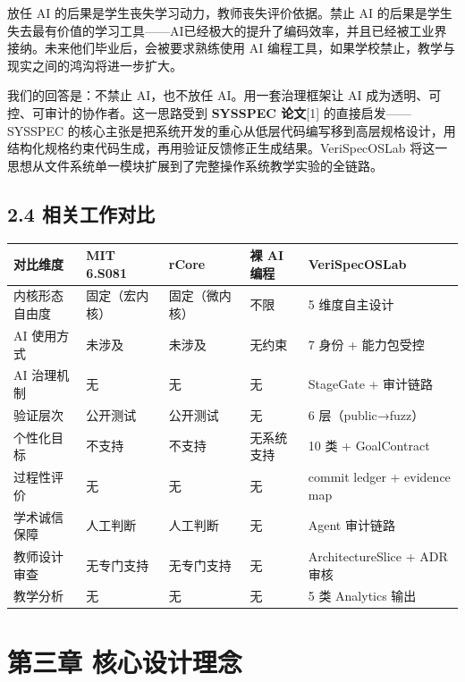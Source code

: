 \documentclass[UTF8,a4paper,12pt,openany]{ctexrep}
\begin{document}
放任 AI 的后果是学生丧失学习动力，教师丧失评价依据。禁止 AI 的后果是学生失去最有价值的学习工具------AI已经极大的提升了编码效率，并且已经被工业界接纳。未来他们毕业后，会被要求熟练使用 AI 编程工具，如果学校禁止，教学与现实之间的鸿沟将进一步扩大。

我们的回答是：不禁止 AI，也不放任 AI。用一套治理框架让 AI 成为透明、可控、可审计的协作者。这一思路受到 \textbf{SYSSPEC 论文}{[}1{]} 的直接启发------SYSSPEC 的核心主张是把系统开发的重心从低层代码编写移到高层规格设计，用结构化规格约束代码生成，再用验证反馈修正生成结果。VeriSpecOSLab 将这一思想从文件系统单一模块扩展到了完整操作系统教学实验的全链路。

\section{2.4 相关工作对比}\label{24-ux76f8ux5173ux5de5ux4f5cux5bf9ux6bd4}

{\def\LTcaptype{none} %
\begin{longtable}{@{}Y{0.17\textwidth}Y{0.13\textwidth}Y{0.13\textwidth}Y{0.13\textwidth}Y{0.31\textwidth}@{}}
\toprule\noalign{}
对比维度 & MIT 6.S081 & rCore & 裸 AI 编程 & VeriSpecOSLab \\
\midrule\noalign{}
\endhead
\bottomrule\noalign{}
\endlastfoot
内核形态自由度 & 固定（宏内核） & 固定（微内核） & 不限 & 5 维度自主设计 \\
AI 使用方式 & 未涉及 & 未涉及 & 无约束 & 7 身份 + 能力包受控 \\
AI 治理机制 & 无 & 无 & 无 & StageGate + 审计链路 \\
验证层次 & 公开测试 & 公开测试 & 无 & 6 层（public→fuzz） \\
个性化目标 & 不支持 & 不支持 & 无系统支持 & 10 类 + GoalContract \\
过程性评价 & 无 & 无 & 无 & commit ledger + evidence map \\
学术诚信保障 & 人工判断 & 人工判断 & 无 & Agent 审计链路 \\
教师设计审查 & 无专门支持 & 无专门支持 & 无 & ArchitectureSlice + ADR 审核 \\
教学分析 & 无 & 无 & 无 & 5 类 Analytics 输出 \\
\end{longtable}
}


\chapter{第三章 核心设计理念}\label{ux7b2cux4e09ux7ae0-ux6838ux5fc3ux8bbeux8ba1ux7406ux5ff5}
\end{document}
